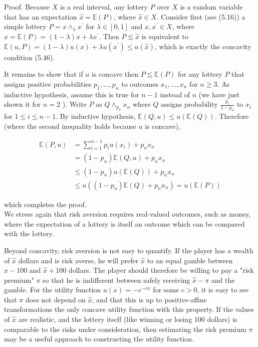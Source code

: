 \documentclass[12pt]{article}
\begin{document}
Proof. Because $X$ is a real interval, any lottery $P$ over $X$ is a random variable that has an expectation $\hat{x}=\mathbb{E}(P)$, where $\hat{x} \in X$. Consider first (see (5.16)) a simple lottery $P=x \wedge_{\lambda} x^{\prime}$ for $\lambda \in[0,1]$ and $x, x^{\prime} \in X$, where $\hat{x}=\mathbb{E}(P)=(1-\lambda) x+\lambda x^{\prime}$. Then $P \lesssim \hat{x}$ is equivalent to $\mathbb{E}(u, P)=(1-\lambda) u(x)+\lambda u\left(x^{\prime}\right) \leq u(\hat{x})$, which is exactly the concavity condition (5.46).

It remains to show that if $u$ is concave then $P \lesssim \mathbb{E}(P)$ for any lottery $P$ that assigns positive probabilities $p_{1}, \ldots, p_{n}$ to outcomes $x_{1}, \ldots, x_{n}$ for $n \geq 3$. As\\
inductive hypothesis, assume this is true for $n-1$ instead of $n$ (we have just shown it for $n=2$ ). Write $P$ as $Q \wedge_{p_{n}} x_{n}$ where $Q$ assigns probability $\frac{p_{i}}{1-p_{n}}$ to $x_{i}$ for $1 \leq i \leq n-1$. By inductive hypothesis, $\mathbb{E}(Q, u) \leq u(\mathbb{E}(Q))$. Therefore (where the second inequality holds because $u$ is concave),

$$
\begin{aligned}
\mathbb{E}(P, u) & =\sum_{i=1}^{n-1} p_{i} u\left(x_{i}\right)+p_{n} x_{n} \\
& =\left(1-p_{n}\right) \mathbb{E}(Q, u)+p_{n} x_{n} \\
& \leq\left(1-p_{n}\right) u(\mathbb{E}(Q))+p_{n} x_{n} \\
& \leq u\left(\left(1-p_{n}\right) \mathbb{E}(Q)+p_{n} x_{n}\right)=u(\mathbb{E}(P))
\end{aligned}
$$

which completes the proof.\\
We stress again that risk aversion requires real-valued outcomes, such as money, where the expectation of a lottery is itself an outcome which can be compared with the lottery.

Beyond concavity, risk aversion is not easy to quantify. If the player has a wealth of $\hat{x}$ dollars and is risk averse, he will prefer $\hat{x}$ to an equal gamble between $\hat{x}-100$ and $\hat{x}+100$ dollars. The player should therefore be willing to pay a "risk premium" $\pi$ so that he is indifferent between safely receiving $\hat{x}-\pi$ and the gamble. For the utility function $u(x)=-e^{-c x}$ for some $c>0$, it is easy to see that $\pi$ does not depend on $\hat{x}$, and that this is up to positive-affine transformations the only concave utility function with this property. If the values of $\hat{x}$ are realistic, and the lottery itself (like winning or losing 100 dollars) is comparable to the risks under consideration, then estimating the risk premium $\pi$ may be a useful approach to constructing the utility function.
\end{document}
